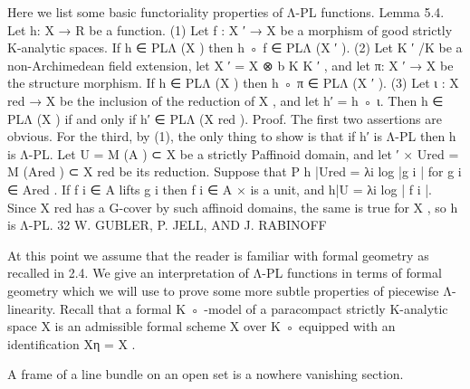 \documentclass[
  10pt,
]{article}
\newenvironment{Shaded}{}{}
\newcommand{\NormalTok}[1]{#1}
\begin{document}
\begin{Shaded}
\begin{Highlighting}[]
\NormalTok{  Here we list some basic functoriality properties of Λ{-}PL functions.}
\NormalTok{Lemma 5.4. Let h: X → R be a function.}
\NormalTok{   (1) Let f : X ′ → X be a morphism of good strictly K{-}analytic spaces. If h ∈ PLΛ (X ) then}
\NormalTok{       h ◦ f ∈ PLΛ (X ′ ).}
\NormalTok{   (2) Let K ′ /K be a non{-}Archimedean field extension, let X ′ = X ⊗}
\NormalTok{                                                                    b K K ′ , and let π: X ′ → X}
\NormalTok{       be the structure morphism. If h ∈ PLΛ (X ) then h ◦ π ∈ PLΛ (X ′ ).}
\NormalTok{   (3) Let ι : X red → X be the inclusion of the reduction of X , and let h′ = h ◦ ι. Then}
\NormalTok{       h ∈ PLΛ (X ) if and only if h′ ∈ PLΛ (X red ).}
\NormalTok{Proof. The first two assertions are obvious. For the third, by (1), the only thing to show is}
\NormalTok{that if h′ is Λ{-}PL then h is Λ{-}PL. Let U = M (A ) ⊂ X be a strictly    Paffinoid domain, and let}
\NormalTok{                                                           ′                                    ×}
\NormalTok{Ured = M (Ared ) ⊂ X red be its reduction. Suppose that P h |Ured = λi log |g i | for g i ∈ Ared  .}
\NormalTok{If f i ∈ A lifts g i then f i ∈ A × is a unit, and h|U = λi log | f i |. Since X red has a G{-}cover}
\NormalTok{by such affinoid domains, the same is true for X , so h is Λ{-}PL.                                 }
\NormalTok{32                              W. GUBLER, P. JELL, AND J. RABINOFF}

\NormalTok{   At this point we assume that the reader is familiar with formal geometry as recalled}
\NormalTok{in 2.4. We give an interpretation of Λ{-}PL functions in terms of formal geometry which}
\NormalTok{we will use to prove some more subtle properties of piecewise Λ{-}linearity. Recall that}
\NormalTok{a formal K ◦ {-}model of a paracompact strictly K{-}analytic space X is an admissible formal}
\NormalTok{scheme X over K ◦ equipped with an identification Xη = X .}

\NormalTok{     A frame of a line bundle on an open set is a nowhere vanishing section.}


\end{Highlighting}
\end{Shaded}
\end{document}
